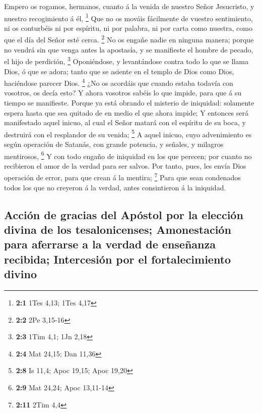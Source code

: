 Empero os rogamos, hermanos, cuanto á la venida de nuestro
Señor Jesucristo, y nuestro recogimiento á él, \footnote{\textbf{2:1}
  1Tes 4,13; 1Tes 4,17}  Que no os mováis fácilmente de
vuestro sentimiento, ni os conturbéis ni por espíritu, ni por palabra,
ni por carta como nuestra, como que el día del Señor esté cerca.
\footnote{\textbf{2:2} 2Pe 3,15-16}  No os engañe nadie en
ninguna manera; porque no vendrá sin que venga antes la apostasía, y se
manifieste el hombre de pecado, el hijo de perdición, \footnote{\textbf{2:3}
  1Tim 4,1; 1Jn 2,18}  Oponiéndose, y levantándose contra
todo lo que se llama Dios, ó que se adora; tanto que se asiente en el
templo de Dios como Dios, haciéndose parecer Dios. \footnote{\textbf{2:4}
  Mat 24,15; Dan 11,36}  ¿No os acordáis que cuando estaba
todavía con vosotros, os decía esto?  Y ahora vosotros
sabéis lo que impide, para que á su tiempo se manifieste. 
Porque ya está obrando el misterio de iniquidad: solamente espera hasta
que sea quitado de en medio el que ahora impide;  Y entonces
será manifestado aquel inicuo, al cual el Señor matará con el espíritu
de su boca, y destruirá con el resplandor de su venida; \footnote{\textbf{2:8}
  Is 11,4; Apoc 19,15; Apoc 19,20}  A aquel inicuo, cuyo
advenimiento es según operación de Satanás, con grande potencia, y
señales, y milagros mentirosos, \footnote{\textbf{2:9} Mat 24,24; Apoc
  13,11-14}  Y con todo engaño de iniquidad en los que
perecen; por cuanto no recibieron el amor de la verdad para ser salvos.
 Por tanto, pues, les envía Dios operación de error, para
que crean á la mentira; \footnote{\textbf{2:11} 2Tim 4,4} 
Para que sean condenados todos los que no creyeron á la verdad, antes
consintieron á la iniquidad.

\hypertarget{acciuxf3n-de-gracias-del-apuxf3stol-por-la-elecciuxf3n-divina-de-los-tesalonicenses-amonestaciuxf3n-para-aferrarse-a-la-verdad-de-enseuxf1anza-recibida-intercesiuxf3n-por-el-fortalecimiento-divino}{%
\subsection{Acción de gracias del Apóstol por la elección divina de los
tesalonicenses; Amonestación para aferrarse a la verdad de enseñanza
recibida; Intercesión por el fortalecimiento
divino}\label{acciuxf3n-de-gracias-del-apuxf3stol-por-la-elecciuxf3n-divina-de-los-tesalonicenses-amonestaciuxf3n-para-aferrarse-a-la-verdad-de-enseuxf1anza-recibida-intercesiuxf3n-por-el-fortalecimiento-divino}}

